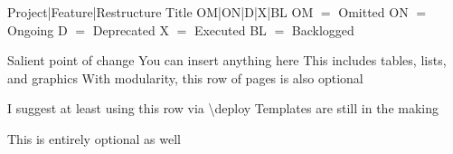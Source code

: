 \documentclass{article}
\begin{document}
\frontmatter
{Project|Feature|Restructure} 
{Title}
{OM|ON|D|X|BL}
{\hfill OM $=$ Omitted \hfill ON $=$ Ongoing \hfill D $=$ Deprecated \hfill X $=$ Executed \hfill BL $=$ Backlogged}

\strategy
{Salient point of change}
{You can insert anything here}
{This includes tables, lists, and graphics}
{With modularity, this row of pages is also optional}

\deploy
{I suggest at least using this row via {\textbackslash}deploy}
{Templates are still in the making}

\report
{This is entirely optional as well}
\end{document}
